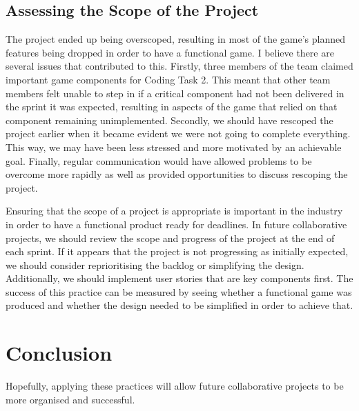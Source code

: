 \documentclass{scrartcl}
\begin{document}
\subsection{Assessing the Scope of the Project}
The project ended up being overscoped, resulting in most of the game's planned features being dropped in order to have a functional game. I believe there are several issues that contributed to this.  Firstly, three members of the team claimed important game components for Coding Task 2. This meant that other team members felt unable to step in if a critical component had not been delivered in the sprint it was expected, resulting in aspects of the game that relied on that component remaining unimplemented. Secondly, we should have rescoped the project earlier when it became evident we were not going to complete everything. This way, we may have been less stressed and more motivated by an achievable goal. Finally, regular communication would have allowed problems to be overcome more rapidly as well as provided opportunities to discuss rescoping the project.

Ensuring that the scope of a project is appropriate is important in the industry in order to have a functional product ready for deadlines.
In future collaborative projects, we should review the scope and progress of the project at the end of each sprint. If it appears that the project is not progressing as initially expected, we should consider reprioritising the backlog or simplifying the design. Additionally, we should implement user stories that are key components first. The success of this practice can be measured by seeing whether a functional game was produced and whether the design needed to be simplified in order to achieve that.


\section{Conclusion}
Hopefully, applying these practices will allow future collaborative projects to be more organised and successful.


\end{document}
